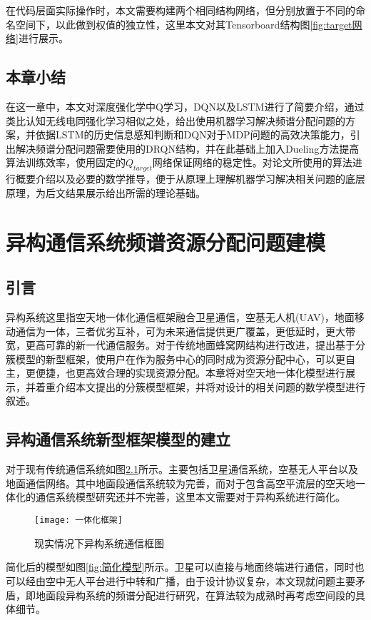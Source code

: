 在代码层面实际操作时，本文需要构建两个相同结构网络，但分别放置于不同的命名空间下，以此做到权值的独立性，这里本文对其Tensorboard结构图\ref{fig:target网络}进行展示。

\section{本章小结}
在这一章中，本文对深度强化学中Q学习，DQN以及LSTM进行了简要介绍，通过类比认知无线电同强化学习相似之处，给出使用机器学习解决频谱分配问题的方案，并依据LSTM的历史信息感知判断和DQN对于MDP问题的高效决策能力，引出解决频谱分配问题需要使用的DRQN结构，并在此基础上加入Dueling方法提高算法训练效率，使用固定的$Q_{target}$网络保证网络的稳定性。对论文所使用的算法进行概要介绍以及必要的数学推导，便于从原理上理解机器学习解决相关问题的底层原理，为后文结果展示给出所需的理论基础。

\chapter{异构通信系统频谱资源分配问题建模}
\section{引言}
异构系统这里指空天地一体化通信框架融合卫星通信，空基无人机(UAV)，地面移动通信为一体，三者优劣互补，可为未来通信提供更广覆盖，更低延时，更大带宽，更高可靠的新一代通信服务。对于传统地面蜂窝网结构进行改进，提出基于分簇模型的新型框架，使用户在作为服务中心的同时成为资源分配中心，可以更自主，更便捷，也更高效合理的实现资源分配。本章将对空天地一体化模型进行展示，并着重介绍本文提出的分簇模型框架，并将对设计的相关问题的数学模型进行叙述。

\section{异构通信系统新型框架模型的建立}
对于现有传统通信系统如图\ref{fig:现有框架}所示。主要包括卫星通信系统，空基无人平台以及地面通信网络。其中地面段通信系统较为完善，而对于包含高空平流层的空天地一体化的通信系统模型研究还并不完善，这里本文需要对于异构系统进行简化。
\begin{figure}[h]
	\centering
	\texttt{[image: 一体化框架]}
	\caption{现实情况下异构系统通信框图}
	\label{fig:现有框架}
\end{figure}

简化后的模型如图\ref{fig:简化模型}所示。卫星可以直接与地面终端进行通信，同时也可以经由空中无人平台进行中转和广播，由于设计协议复杂，本文现就问题主要矛盾，即地面段异构系统的频谱分配进行研究，在算法较为成熟时再考虑空间段的具体细节。

